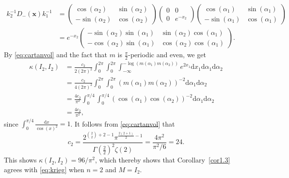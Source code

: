 \documentclass[11pt,reqno]{amsart}
\theoremstyle{definition}
\theoremstyle{remark}
\numberwithin{equation}{section}
\numberwithin{thm}{section}
\numberwithin{table}{section}
\newcommand{\x}{\mathbf{x}}
\begin{document}
          \begin{align*}
         k_2^{-1} D_{-}(\x) k_1^{-1}
    &= 
    \begin{pmatrix}
        \cos (\alpha_2) & \sin (\alpha_2) \\
        -\sin(\alpha_2) & \cos(\alpha_2)
    \end{pmatrix}
     \begin{pmatrix}
        0 & 0 \\
        0 & e^{-x_2}
    \end{pmatrix}
     \begin{pmatrix}
        \cos (\alpha_1) & \sin (\alpha_1) \\
        -\sin(\alpha_1) & \cos(\alpha_1)
    \end{pmatrix}
    \\
    &=
    e^{-x_2}
    \begin{pmatrix}
        -\sin (\alpha_2)
        \sin (\alpha_1)& \sin (\alpha_2)\cos (\alpha_1) \\
        -\cos (\alpha_2)\sin (\alpha_1) & \cos (\alpha_2)\cos (\alpha_1)
    \end{pmatrix}.
    \end{align*}    
    By \eqref{eq:cartanvol} and the fact that $m$ is $\tfrac{\pi}{2}$-periodic and even, we get 
    \begin{align*}
        \kappa (I_2,I_2) &=  \frac{c_2}{2 (2 \pi)^2} \int_{0}^{2 \pi}  \int_0^{2 \pi} 
        \int_{-\infty}^{-\log(m(\alpha_1)m(\alpha_2))}
       e^{2x_1}
          \mathrm{d} x_1
        \mathrm{d} \alpha_1
      \mathrm{d} \alpha_2 \\
      &= 
      \frac{c_2}{4 (2 \pi)^2} \int_{0}^{2 \pi}  \int_0^{2 \pi} 
        (m(\alpha_1)
        m(\alpha_2))^{-2} 
        \mathrm{d} \alpha_1
      \mathrm{d} \alpha_2 \\
      & =
      \frac{4 c_2}{ \pi^2} \int_{0}^{ \pi/4}  \int_0^{\pi/4} 
        (\cos(\alpha_1)
        \cos(\alpha_2))^{-2}
        \mathrm{d} \alpha_1
      \mathrm{d} \alpha_2 
      \\
      & = 
      \frac{4 c_2}{ \pi^2},
    \end{align*}
since $\int_0^{\pi/4} \frac{\mathrm{d}x}{\cos(x)^2} =1$. 
It follows from \eqref{eq:cartanvol} that 
    \[
     c_2 =  
      \frac{
      2^{\binom{2}{2}+2-1} \pi^{\frac{2(2+1)}{2}-1}
      }{ 
       \Gamma(\tfrac{2}{2})^{2} \zeta(2)} = \frac{4 \pi^{2}}{{\pi^2}/{6}} = 24.
    \]
    This shows 
    $\kappa (I_2, I_2) = {96}/{\pi^2}$, which thereby shows that 
    Corollary~\ref{cor1.3} agrees with  \eqref{eq:krieg}
when  $n =2$ and $M = I_2$. 
\end{document}
